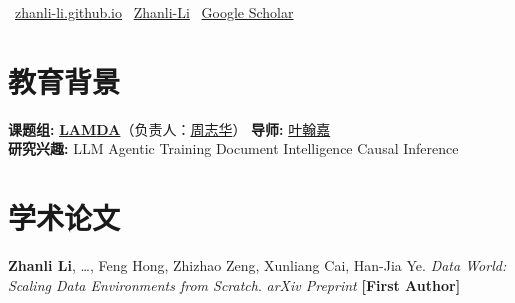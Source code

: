 \documentclass{resume}
\begin{document}



\vspace{-0.45ex}
\centerline{\sffamily\normalsize
  \faHome\ \href{https://zhanli-li.github.io}{zhanli-li.github.io} \quad
  \faGithub\ \href{https://github.com/Zhanli-Li}{Zhanli-Li} \quad
  \faGraduationCap\ \href{https://scholar.google.com/citations?user=LW5bAdAAAAAJ}{Google Scholar}}
\vspace{-0.15ex}
\section{教育背景}
\textbf{课题组:} \href{https://www.lamda.nju.edu.cn}{\textbf{\textcolor{lamdaorange}{L}\textcolor{lamdapurple}{A}\textcolor{lamdaorange}{M}\textcolor{lamdapurple}{DA}}}（负责人：\href{https://cs.nju.edu.cn/zhouzh/}{周志华}） \quad \textbf{导师:} \href{https://www.lamda.nju.edu.cn/yehj/}{叶翰嘉} \\
\textbf{研究兴趣:} LLM \quad Agentic Training \quad Document Intelligence \quad Causal Inference


\section{学术论文}
\textbf{Zhanli Li}, \ldots, Feng Hong, Zhizhao Zeng, Xunliang Cai, Han-Jia Ye. \textit{Data World: Scaling Data Environments from Scratch}. \textit{arXiv Preprint} \quad \textbf{[First Author]}
\end{document}
